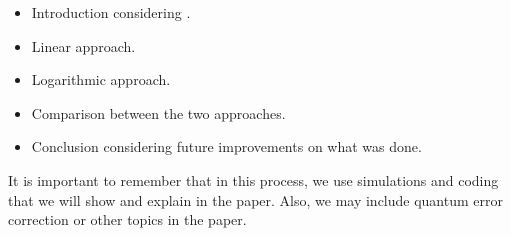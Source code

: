 \documentclass{article}
\begin{document}
    \begin{itemize}
        \item Introduction considering \cite{universalcontrolplane}.
        \item Linear approach.
        \item Logarithmic approach.
        \item Comparison between the two approaches.
        \item Conclusion considering future improvements on what was done.
    \end{itemize}

    It is important to remember that in this process, we use simulations and coding that we will show and explain in the paper. Also, we may include quantum error correction or other topics in the paper.\\

    
    
    
\end{document}
